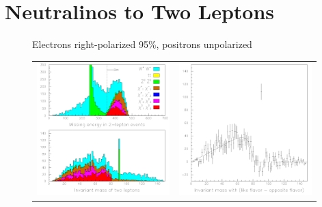 \documentclass[12pt]{article}
\begin{document}
\section{Neutralinos to Two Leptons}

\begin{figure}[t]
  \begin{center}
    Electrons right-polarized 95\%, positrons unpolarized
    \begin{tabular}{p{0.49\linewidth} p{0.49\linewidth}}
      \begin{minipage}{\linewidth} \includegraphics[width=\linewidth]{jimptwoleptons_a} \end{minipage} &
      \begin{minipage}{\linewidth} \includegraphics[width=\linewidth]{jimptwoleptons_b} \end{minipage}

\end{tabular}
\end{center}
\end{figure}
\end{document}
